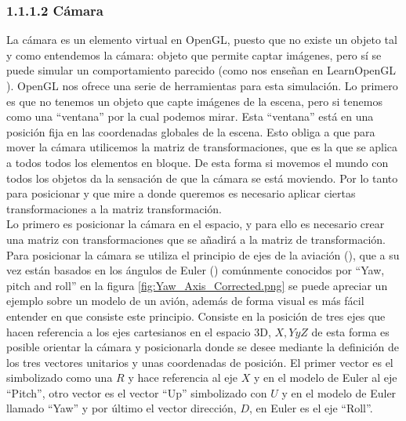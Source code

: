 \subsubsection{1.1.1.2 Cámara}
La cámara es un elemento virtual en OpenGL, puesto que no existe un objeto tal y como entendemos la cámara: objeto que permite captar imágenes, pero sí se puede simular un comportamiento parecido (como nos enseñan en LearnOpenGL \cite{LearnOpenGLCamera}). OpenGL nos ofrece una serie de herramientas para esta simulación. Lo primero es que no tenemos un objeto que capte imágenes de la escena, pero si tenemos como una ``ventana'' por la cual podemos mirar. Esta ``ventana'' está en una posición fija en las coordenadas globales de la escena. Esto obliga a que para mover la cámara utilicemos la matriz de transformaciones, que es la que se aplica a todos todos los elementos en bloque. De esta forma si movemos el mundo con todos los objetos da la sensación de que la cámara se está moviendo. Por lo tanto para posicionar y que mire a donde queremos es necesario aplicar ciertas transformaciones a la matriz transformación.\\

Lo primero es posicionar la cámara en el espacio, y para ello es necesario crear una matriz con transformaciones que se añadirá a la matriz de transformación. Para posicionar la cámara se utiliza el principio de ejes de la aviación (\cite{AircraftPrincipalAxes2018}), que a su vez están basados en los ángulos de Euler (\cite{EulerAnglesWolfram}) comúnmente conocidos por ``Yaw, pitch and roll'' en la figura \ref{fig:Yaw_Axis_Corrected.png} se puede apreciar un ejemplo sobre un modelo de un avión, además de forma visual es más fácil entender en que consiste este principio. Consiste en la posición de tres ejes que hacen referencia a los ejes cartesianos en el espacio 3D, $X, Y y Z$ de esta forma es posible orientar la cámara y posicionarla donde se desee mediante la definición de los tres vectores unitarios y unas coordenadas de posición. El primer vector es el simbolizado como una $R$ y hace referencia al eje $X$ y en el modelo de Euler al eje ``Pitch'', otro vector es el vector ``Up'' simbolizado con $U$ y en el modelo de Euler llamado ``Yaw'' y por último el vector dirección, $D$, en Euler es el eje ``Roll''.\\

